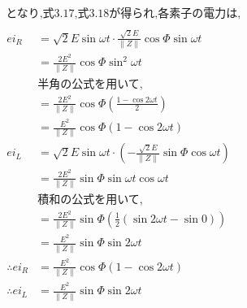 \documentclass[twocolumn]{article}
\begin{document}
\begin{enumerate}
\begin{align*}
      &\text{となり,式3.17,式3.18が得られ,各素子の電力は,}\\
    \end{align*}
    \begin{align*}
      ei_R  &= \sqrt{2}E\sin\omega t \cdot \frac{\sqrt{2}E}{\|Z\|}\cos\Phi\sin\omega t\\
            &= \frac{2E^2}{\|Z\|}\cos\Phi\sin^2\omega t\\
      &\text{半角の公式を用いて,}\\
            &= \frac{2E^2}{\|Z\|}\cos\Phi\left(\frac{1 - \cos 2\omega t}{2}\right)\\
            &= \frac{E^2}{\|Z\|}\cos\Phi\left(1 - \cos 2\omega t\right)\\
      ei_L  &= \sqrt{2}E\sin\omega t \cdot \left(-\frac{\sqrt{2}E}{\|Z\|} \sin \Phi \cos \omega t \right)\\
            &= \frac{2E^2}{\|Z\|} \sin\Phi \sin\omega t\cos\omega t \\
      &\text{積和の公式を用いて,}\\
      &= \frac{2E^2}{\|Z\|}\sin\Phi \left( \frac{1}{2} \left(\sin 2\omega t - \sin 0 \right) \right)\\
      &= \frac{E^2}{\|Z\|}\sin\Phi\sin 2\omega t\\
      \therefore ei_R  &= \frac{E^2}{\|Z\|}\cos\Phi\left(1 - \cos 2\omega t\right)\\
      \therefore ei_L  &= \frac{E^2}{\|Z\|}\sin\Phi\sin 2\omega t\\
    \end{align*}


\end{enumerate}
\end{document}
